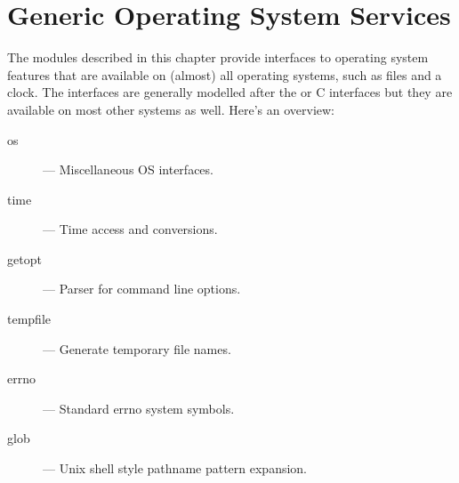 \chapter{Generic Operating System Services}

The modules described in this chapter provide interfaces to operating
system features that are available on (almost) all operating systems,
such as files and a clock.  The interfaces are generally modelled
after the \UNIX{} or C interfaces but they are available on most other
systems as well.  Here's an overview:

\begin{description}

\item[os]
--- Miscellaneous OS interfaces.

\item[time]
--- Time access and conversions.

\item[getopt]
--- Parser for command line options.

\item[tempfile]
--- Generate temporary file names.

\item[errno]
--- Standard errno system symbols.

\item[glob]
--- Unix shell style pathname pattern expansion.

\end{description}
